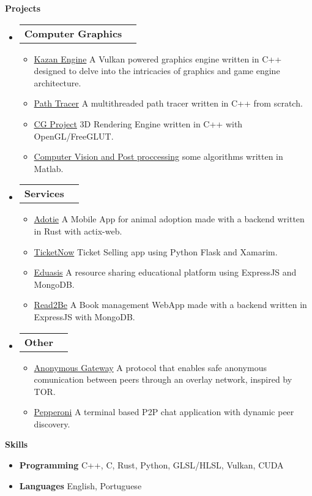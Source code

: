 \documentclass[letterpaper,12pt]{article}[leftmargin=*]
\makeatletter
\def \entryspacing {-0pt}
\renewcommand{\section}[2]{\vspace{5pt}
  \colorbox{secondary}{\color{white}\raggedbottom\normalsize\textbf{{#1}{\hspace{7pt}#2\hspace{7pt}}}}
}
\newcommand{\resumeEntryStart}{\begin{itemize}[leftmargin=2.5mm]}
\newcommand{\resumeEntryEnd}{\end{itemize}\vspace{\entryspacing}}
\newcommand{\resumeItemListStart}{\begin{itemize}[leftmargin=4.5mm]}
\newcommand{\resumeItemListEnd}{\end{itemize}}
\newcommand{\resumeItem}[1]{
  \item\small{
    {#1 \vspace{-2pt}}
  }
}
\newcommand{\resumeEntryTD}[2]{
  \vspace{-1pt}\item[]
    \begin{tabularx}{0.97\textwidth}{X@{\hspace{60pt}}r}
      \textbf{\color{primary}#1} & {\firabook\color{accent}\small#2} \\
    \end{tabularx}\vspace{-6pt}
}
\newcommand{\resumeEntryS}[2]{
  \item[]\small{
    \textbf{\color{primary}#1 }{ #2 \vspace{-6pt}}
  }
}
\makeatother
\begin{document}
\section{}{Projects}

  \resumeEntryStart
    \resumeEntryTD{Computer Graphics}{}
    \resumeItemListStart
      \resumeItem {\underline{Kazan Engine} A Vulkan powered graphics engine written in C++ designed to delve into the intricacies of graphics and game engine architecture.}
      \resumeItem {\underline{Path Tracer} A multithreaded path tracer written in C++ from scratch.}
      \resumeItem {\underline{CG Project} 3D Rendering Engine written in C++ with OpenGL/FreeGLUT.}
      \resumeItem {\underline{Computer Vision and Post proccessing} some algorithms written in Matlab.}
    \resumeItemListEnd
  \resumeEntryEnd

  \resumeEntryStart
    \resumeEntryTD{Services}{}
    \resumeItemListStart
      \resumeItem {\underline{Adotie} A Mobile App for animal adoption made with a backend written in Rust with actix-web.}
      \resumeItem {\underline{TicketNow} Ticket Selling app using Python Flask and Xamarim.}
      \resumeItem {\underline{Eduasis} A resource sharing educational platform using ExpressJS and MongoDB.}
      \resumeItem {\underline{Read2Be} A Book management WebApp made with a backend written in ExpressJS with MongoDB.}
    \resumeItemListEnd
  \resumeEntryEnd

  \resumeEntryStart
    \resumeEntryTD{Other}{}
    \resumeItemListStart
      \resumeItem {\underline{Anonymous Gateway} A protocol that enables safe anonymous comunication between peers through an overlay network, inspired by TOR.}
      \resumeItem {\underline{Pepperoni} A terminal based P2P chat application with dynamic peer discovery.}
    \resumeItemListEnd
  \resumeEntryEnd

\section{}{Skills}
 \resumeEntryStart
  \resumeEntryS{Programming} {C++, C, Rust, Python, GLSL/HLSL, Vulkan, CUDA}
  \resumeEntryS{Languages} {English, Portuguese}
 \resumeEntryEnd
\end{document}
